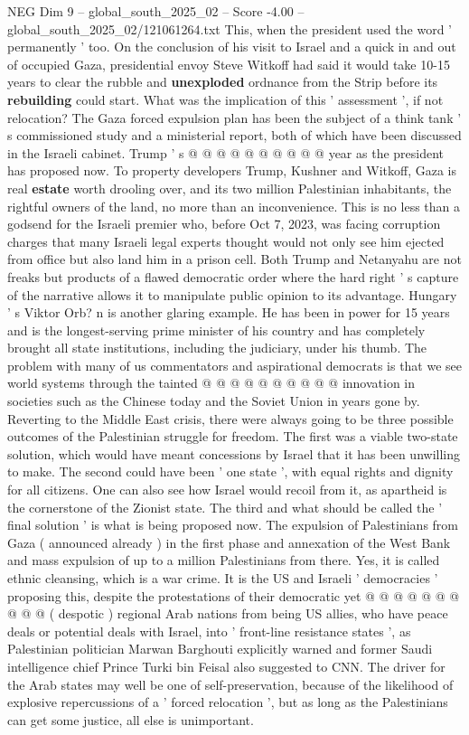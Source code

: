 \begin{textsample}{NEG Dim 9 – global\_south\_2025\_02 – Score -4.00 – global\_south\_2025\_02/121061264.txt}
This, when the president used the word ' permanently ' too.
On the conclusion of his visit to Israel and a quick in and out of occupied Gaza, presidential envoy Steve Witkoff had said it would take 10-15 years to clear the rubble and \textbf{unexploded} ordnance from the Strip before its \textbf{rebuilding} could start.
What was the implication of this ' assessment ', if not relocation?
The Gaza forced expulsion plan has been the subject of a think tank ' s commissioned study and a ministerial report, both of which have been discussed in the Israeli cabinet.
Trump ' s @ @ @ @ @ @ @ @ @ @ year as the president has proposed now.
To property developers Trump, Kushner and Witkoff, Gaza is real \textbf{estate} worth drooling over, and its two million Palestinian inhabitants, the rightful owners of the land, no more than an inconvenience.
This is no less than a godsend for the Israeli premier who, before Oct 7, 2023, was facing corruption charges that many Israeli legal experts thought would not only see him ejected from office but also land him in a prison cell.
Both Trump and Netanyahu are not freaks but products of a flawed democratic order where the hard right ' s capture of the narrative allows it to manipulate public opinion to its advantage.
Hungary ' s Viktor Orb? n is another glaring example.
He has been in power for 15 years and is the longest-serving prime minister of his country and has completely brought all state institutions, including the judiciary, under his thumb.
The problem with many of us commentators and aspirational democrats is that we see world systems through the tainted @ @ @ @ @ @ @ @ @ @ innovation in societies such as the Chinese today and the Soviet Union in years gone by.
Reverting to the Middle East crisis, there were always going to be three possible outcomes of the Palestinian struggle for freedom.
The first was a viable two-state solution, which would have meant concessions by Israel that it has been unwilling to make.
The second could have been ' one state ', with equal rights and dignity for all citizens.
One can also see how Israel would recoil from it, as apartheid is the cornerstone of the Zionist state.
The third and what should be called the ' final solution ' is what is being proposed now.
The expulsion of Palestinians from Gaza ( announced already ) in the first phase and annexation of the West Bank and mass expulsion of up to a million Palestinians from there.
Yes, it is called ethnic cleansing, which is a war crime.
It is the US and Israeli ' democracies ' proposing this, despite the protestations of their democratic yet @ @ @ @ @ @ @ @ @ @ ( despotic ) regional Arab nations from being US allies, who have peace deals or potential deals with Israel, into ' front-line resistance states ', as Palestinian politician Marwan Barghouti explicitly warned and former Saudi intelligence chief Prince Turki bin Feisal also suggested to CNN.
The driver for the Arab states may well be one of self-preservation, because of the likelihood of explosive repercussions of a ' forced relocation ', but as long as the Palestinians can get some justice, all else is unimportant.

\end{textsample}
